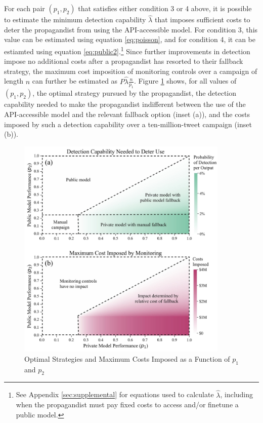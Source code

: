 \documentclass{article}
\begin{document}
For each pair $(p_1, p_2)$ that satisfies either condition 3 or 4 above, it is possible to estimate the minimum detection capability $\hat{\lambda}$ that imposes sufficient costs to deter the propagandist from using the API-accessible model. For condition 3, this value can be estimated using equation \ref{eq:poisson}, and for condition 4, it can be estiamted using equation \ref{eq:public2}.\footnote{See Appendix \ref{sec:supplemental} for equations used to calculate $\hat{\lambda}$, including when the propagandist must pay fixed costs to access and/or finetune a public model.} Since further improvements in detection impose no additional costs after a propagandist has resorted to their fallback strategy, the maximum cost imposition of monitoring controls over a campaign of length $n$ can further be estimated as $P \hat{\lambda} \frac{n}{p_1}$. Figure \ref{fig:strategies} shows, for all values of $(p_1, p_2)$, the optimal strategy pursued by the propagandist, the detection capability needed to make the propagandist indifferent between the use of the API-accessible model and the relevant fallback option (inset (a)), and the costs imposed by such a detection capability over a ten-million-tweet campaign (inset (b)). 

\begin{figure}[h]
  \centering
  \includegraphics[width=0.9\textwidth]{figures/strategies_edited.jpg}
  \caption{Optimal Strategies and Maximum Costs Imposed as a Function of $p_1$ and $p_2$}
  \label{fig:strategies}
\end{figure}
\end{document}
